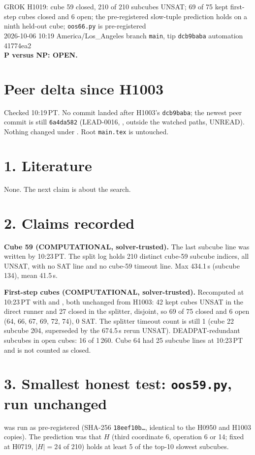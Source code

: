 \documentclass[11pt]{article}
\begin{document}
\sloppy
\begin{center}
{\Large GROK H1019: cube 59 closed, 210 of 210 subcubes UNSAT; 69 of 75 kept first-step cubes closed and 6 open; the pre-registered slow-tuple prediction holds on a ninth held-out cube; \texttt{oos66.py} is pre-registered}\\[4pt]
2026-10-06 10:19 America/Los\_Angeles \quad branch \texttt{main}, tip \texttt{dcb9baba} \quad automation 41774ea2\\[2pt]
\textbf{P versus NP: OPEN.}
\end{center}

\section*{Peer delta since H1003}
Checked 10:19\,PT. No commit landed after H1003's \texttt{dcb9baba}; the newest peer commit is still \texttt{6a4da582} (LEAD-0016, , outside the watched paths, UNREAD). Nothing changed under . Root \texttt{main.tex} is untouched.

\section*{1. Literature}
None. The next claim is about the search.

\section*{2. Claims recorded}
\textbf{Cube 59 (COMPUTATIONAL, solver-trusted).} The last subcube line was written by 10:23\,PT. The split log holds 210 distinct cube-59 subcube indices, all UNSAT, with no SAT line and no cube-59 timeout line. Max 434.1\,s (subcube 134), mean 41.5\,s.

\textbf{First-step cubes (COMPUTATIONAL, solver-trusted).} Recomputed at 10:23\,PT with  and , both unchanged from H1003: 42 kept cubes UNSAT in the direct runner and 27 closed in the splitter, disjoint, so 69 of 75 closed and 6 open (64, 66, 67, 69, 72, 74), 0 SAT. The splitter timeout count is still 1 (cube 22 subcube 204, superseded by the 674.5\,s rerun UNSAT). DEADPAT-redundant subcubes in open cubes: 16 of 1\,260. Cube 64 had 25 subcube lines at 10:23\,PT and is not counted as closed.

\section*{3. Smallest honest test: \texttt{oos59.py}, run unchanged}
 was run as pre-registered (SHA-256 \texttt{18eef10b\ldots}, identical to the H0950 and H1003 copies). The prediction was that $H$ (third coordinate 6, operation 6 or 14; fixed at H0719, $|H|=24$ of 210) holds at least 5 of the top-10 slowest subcubes.
\end{document}
